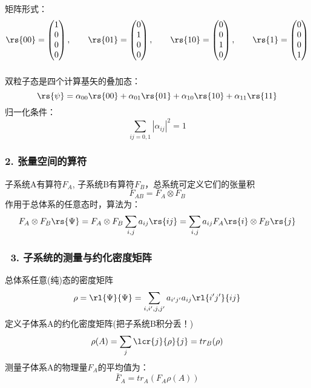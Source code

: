 \begin{frame}
矩阵形式：
    \[
\rs{00} = 
\begin{pmatrix}
    1\\
    0\\
    0\\
    0
\end{pmatrix},\qquad
\rs{01} = 
\begin{pmatrix}
    0\\
    1\\
    0\\
    0
\end{pmatrix},\qquad
\rs{10} = 
\begin{pmatrix}
    0\\
    0\\
    1\\
    0
\end{pmatrix},\qquad
\rs{1} = 
\begin{pmatrix}
    0\\
    0\\
    0\\
    1
\end{pmatrix}
\] 
\end{frame}

\begin{frame}
    \frametitle{}
    双粒子态是四个计算基矢的叠加态：
    \[\rs{\psi} =\alpha_{00}\rs{00}+\alpha_{01}\rs{01}+\alpha_{10}\rs{10}+\alpha_{11}\rs{11}\]
    归一化条件：
    \[ \sum_{ij=0,1} |\alpha_{ij}|^2= 1\]
\end{frame}

\begin{frame}
      \frametitle{ 2. 张量空间的算符}
    子系统A有算符$F_A$, 子系统B有算符$F_B$，总系统可定义它们的张量积
    \[F_{AB}=F_A \otimes F_B\]
    作用于总体系的任意态时，算法为：
    \[F_A \otimes F_B \rs{\Psi} = F_A \otimes F_B \sum_{i,j} a_{ij}\rs{ij}=  \sum_{i,j} a_{ij}F_A \rs{i}\otimes F_B\rs{j}\]   
\end{frame}

\begin{frame}
    \frametitle{~3. 子系统的测量与约化密度矩阵}
    总体系任意(纯)态的密度矩阵
    \[ \rho=\rl{\Psi} {\Psi}= \sum_{i,i',j,j'} a_{i'j'}a_{ij}\rl{i'j'}{ij}\] 
    定义子体系A的约化密度矩阵(把子系统B积分丢！)
    \[ \rho(A)=\sum_{j}\lcr{j}{\rho}{j}=tr_B(\rho)\] 
    测量子体系A的物理量$F_A$的平均值为：
    \[ \bar{F}_A=tr_A(F_A\rho(A))\] 
    
\end{frame}

